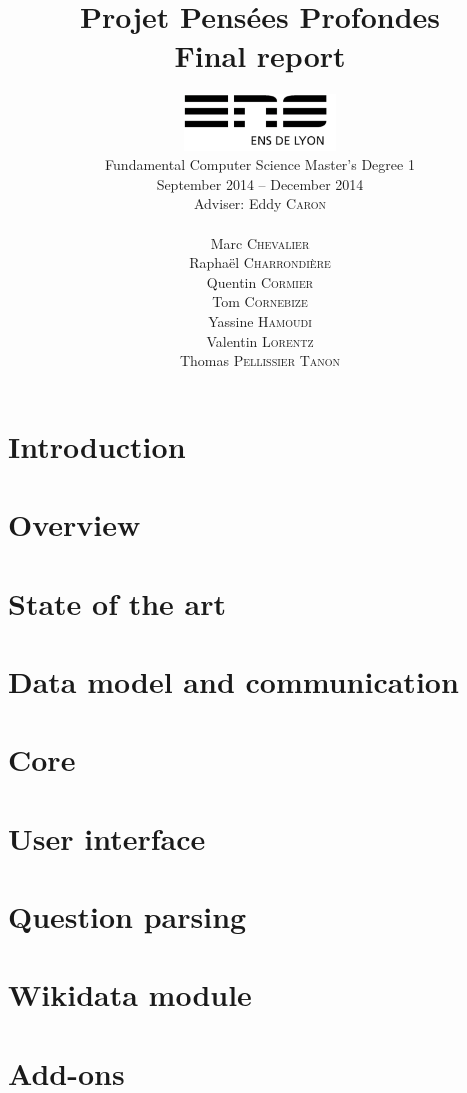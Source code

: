 \documentclass[a4paper,10pt]{report}
\title{Projet Pensées Profondes\\\large Final report}
\author{\includegraphics[width=0.3\textwidth]{../logo_ensl.pdf}\\[50pt]
Fundamental Computer Science Master's Degree 1\\September 2014 \--- December 2014\\[50pt]
Adviser: Eddy \textsc{Caron}\\[50pt]
\begin{minipage}{0.4\textwidth}
    \begin{flushleft} \large
        Marc \textsc{Chevalier}
        \\
        Raphaël \textsc{Charrondière}
        \\
        Quentin \textsc{Cormier}
        \\
        Tom \textsc{Cornebize}
    \end{flushleft}
\end{minipage}
\begin{minipage}{0.4\textwidth}
    \begin{flushright} \large
        Yassine \textsc{Hamoudi}
        \\
        Valentin \textsc{Lorentz}
        \\
        Thomas \textsc{Pellissier Tanon}
        \\
    \end{flushright}
\end{minipage}
}
\date{}
\begin{document}
\maketitle



\tableofcontents

\chapter*{Introduction}
    

\chapter{Overview}
    

\chapter{State of the art}
    

\chapter{Data model and communication}
    

\chapter{Core}
    

\chapter{User interface}
    

\chapter{Question parsing}
    
    
    
    

\chapter{Wikidata module}
    

\chapter{Add-ons}
    
    
\end{document}
